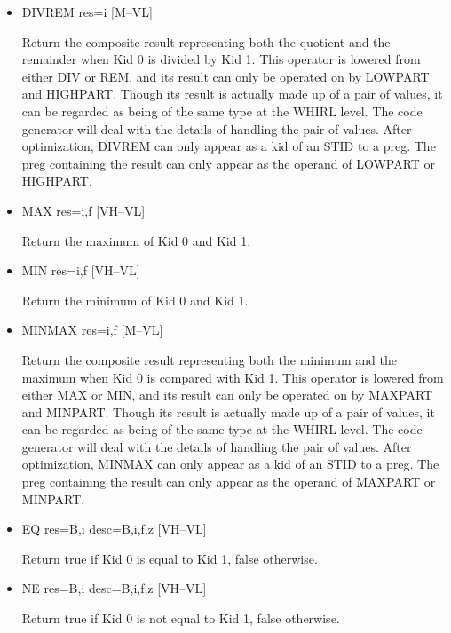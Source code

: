 \documentclass{article}
\begin{document}
\begin{itemize}
\item
{}%
DIVREM res=i \hfill [M--VL]

Return the composite result representing both the quotient and the
remainder when Kid 0 is divided by Kid 1. This operator is lowered
from either
%
DIV or
%
REM, and its result can only be operated on by
%
LOWPART and
%
HIGHPART. Though its result is actually made up of a pair of
values, it can be regarded as being of the same type at the WHIRL
level. The code generator will deal with the details of handling the pair of
values. After optimization,
%
DIVREM can only appear as a kid of an
%
STID to a preg. The preg
containing the result can only appear as the operand of
%
LOWPART or
%
HIGHPART.

\item
{}%
MAX res=i,f \hfill [VH--VL]

Return the maximum of Kid 0 and Kid 1.

\item
{}%
MIN res=i,f \hfill [VH--VL]

Return the minimum of Kid 0 and Kid 1.

\item
{}%
MINMAX res=i,f \hfill [M--VL]

Return the composite result representing both the minimum and the
maximum when Kid 0 is compared with Kid 1. This operator is lowered
from either
%
MAX or
%
MIN, and its result can only be operated on by
%
%
MAXPART and
%
%
MINPART. Though its result is actually made up of a pair of values,
it can be regarded as being of the same type at the WHIRL level.
The code
generator will deal with the details of handling the pair of values.
After optimization,
%
MINMAX can only appear as a kid of an
%
STID to a preg. The
preg containing the result can only appear as the operand of
%
MAXPART
or
%
MINPART.

%
\item  EQ res=B,i desc=B,i,f,z \hfill [VH--VL]

Return true if Kid 0 is equal to Kid 1, false otherwise.

%
\item  NE res=B,i desc=B,i,f,z \hfill [VH--VL]

Return true if Kid 0 is not equal to Kid 1, false otherwise.


\end{itemize}
\end{document}

